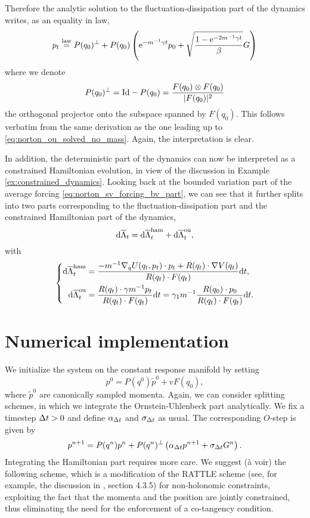 Therefore the analytic solution to the fluctuation-dissipation part of the dynamics writes, as an equality in law,
\begin{equation}
    \label{eq:norton_sv_fd_part_solved_ii}
            p_t\overset{\mathrm{law}}{=}P(q_0)^\perp +P(q_0)\left(\mathrm{e}^{-m^{-1}\gamma t}p_0+\sqrt{\frac{1-\mathrm{e}^{-2m^{-1}\gamma t}}{\beta}}G\right)
\end{equation}
where we denote
\[P(q_0)^\perp=\mathrm{Id}-P(q_0)=\frac{F(q_0)\otimes F(q_0)}{|F(q_0)|^2}\]
the orthogonal projector onto the subspace spanned by $F(q_0)$. This follows verbatim from the same derivation as the one leading up to \eqref{eq:norton_ou_solved_no_mass}. Again, the interpretation is clear.

In addition, the deterministic part of the dynamics can now be interpreted as a constrained Hamiltonian evolution, in view of the discussion in Example \ref{ex:constrained_dynamics}.
Looking back at the bounded variation part of the average forcing \eqref{eq:norton_sv_forcing_bv_part}, we can see that it further splits into two parts corresponding to the fluctuation-dissipation part and the constrained Hamiltonian part of the dynamics,
\[\mathrm{d} \overline{\Lambda}_t =\mathrm{d} \overline{\Lambda}^{\mathrm{ham}}_t+\mathrm{d} \overline{\Lambda}^{\mathrm{ou}}_t,\]
with
\begin{equation}\left\{\begin{aligned}
    \mathrm{d} \overline{\Lambda}_t^{\mathrm{ham}}&=\frac{-m^{-1}\nabla_q U(q_t,p_t)\cdot p_t +R(q_t)\cdot\nabla V(q_t)}{R(q_t)\cdot F(q_t)}\mathrm{d} t,\\
    \mathrm{d} \overline{\Lambda}_t^{\mathrm{ou}}&=\frac{R(q_t)\cdot\gamma m^{-1}p_t}{R(q_t)\cdot F(q_t)}\mathrm{d} t=\gamma_1m^{-1}\frac{R(q_0)\cdot p_0}{R(q_t)\cdot F(q_t)}\mathrm{d} t.
\end{aligned}\right.
\end{equation}

\section{Numerical implementation}
We initialize the system on the constant response manifold by setting 
\[p^0=P(q^0)\tilde{p}^0+vF(q_0),\]
where $\tilde p^0$ are canonically sampled momenta.
Again, we can consider splitting schemes, in which we integrate the Ornstein-Uhlenbeck part analytically. We fix a timestep ${\Delta t}>0$ and define $\alpha_{{\Delta t}}$ and $\sigma_{{\Delta t}}$ as usual.
The corresponding $O$-step is given by
    \begin{equation}
        \label{eq:norton_sv_o_step}
            p^{n+1}=P(q^n)p^n+P(q^n)^\perp\left(\alpha_{\Delta t}p^{n+1}+\sigma_{\Delta t}G^{n}\right).\\
    \end{equation}
Integrating the Hamiltonian part requires more care. We suggest (à voir) the following scheme, which is a modification of the RATTLE scheme (see, for example, the discussion in \cite{LM15}, section 4.3.5) for non-holonomic constraints,
exploiting the fact that the momenta and the position are jointly constrained, thus eliminating the need for the enforcement of a co-tangency condition.

